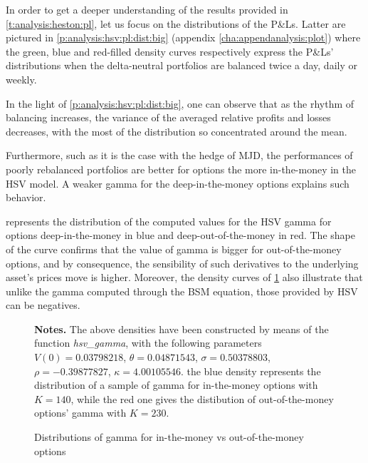 \documentclass[a4paper, 12pt]{report}
\begin{document}
In order to get a deeper understanding of the results provided in \cref{t:analysis:heston:pl}, let us focus on the distributions of the P\&Ls. 
Latter are pictured in \cref{p:analysis:hsv:pl:dist:big} (appendix \cref{cha:appendanalysis:plot}) where the green, blue and red-filled density curves respectively express the P\&Ls' distributions when the delta-neutral portfolios are balanced twice a day, daily or weekly.




         

In the light of \cref{p:analysis:hsv:pl:dist:big}, one can observe that as the rhythm of balancing increases, the variance of the averaged relative profits and losses decreases, with the most of the distribution so concentrated around the mean.



Furthermore, such as it is the case with the hedge of MJD, the performances of poorly rebalanced portfolios are better for options the more in-the-money in the HSV model. 
A weaker gamma for the deep-in-the-money options explains such behavior.

 represents the distribution of the computed values for the HSV gamma for options deep-in-the-money in blue and deep-out-of-the-money in red.
The shape of the curve confirms that the value of gamma is bigger for out-of-the-money options, and by consequence, the sensibility of such derivatives to the underlying asset's prices move is higher.
Moreover, the density curves of \cref{p:analysis:hsv:gamma} also illustrate that unlike the gamma computed through the BSM equation, those provided by HSV can be negatives.




\begin{figure}[h]
  \centering
  
  \caption{Distributions of gamma for in-the-money vs out-of-the-money options}
  \begin{changemargin}{0.5cm}{0.5cm}
  \medskip
\footnotesize
{}\textbf{Notes.} The above densities have been constructed by means of the function \textit{hsv\_gamma}, with the following parameters $V(0) = 0.03798218$, $\theta = 0.04871543$, $\sigma = 0.50378803$, $\rho = -0.39877827$, $\kappa = 4.00105546$. the blue density represents the distribution of a sample of gamma for in-the-money options with $K = 140$, while the red one gives the distibution of out-of-the-money options' gamma with $K = 230$.
  \end{changemargin}
  \label{p:analysis:hsv:gamma}
\end{figure}
\end{document}
